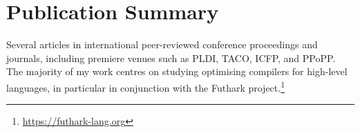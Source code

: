 \documentclass{resume} %
\begin{document}
\section{Publication Summary}

Several articles in international peer-reviewed conference proceedings
and journals, including premiere venues such as PLDI, TACO, ICFP, and
PPoPP.  The majority of my work centres on studying optimising
compilers for high-level languages, in particular in conjunction with
the Futhark project.\footnote{\url{https://futhark-lang.org}}
\end{document}
